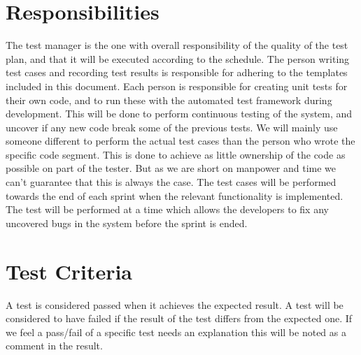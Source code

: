 \section{Responsibilities}
The test manager is the one with overall responsibility of the quality of the test plan, and that it will be executed according to the schedule. The person writing test cases and recording test results is responsible for adhering to the templates included in this document. Each person is responsible for creating unit tests for their own code, and to run these with the automated test framework during development. This will be done to perform continuous testing of the system, and uncover if any new code break some of the previous tests. We will mainly use someone different to perform the actual test cases than the person who wrote the specific code segment. This is done to achieve as little ownership of the code as possible on part of the tester. But as we are short on manpower and time we can’t guarantee that this is always the case. The test cases will be performed towards the end of each sprint when the relevant functionality is implemented. The test will be performed at a time which allows the developers to fix any uncovered bugs in the system before the sprint is ended. 

\section{Test Criteria}
A test is considered passed when it achieves the expected result. A test will be considered to have failed if the result of the test differs from the expected one. If we feel a pass/fail of a specific test needs an explanation this will be noted as a comment in the result.